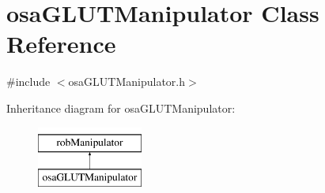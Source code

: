 \hypertarget{classosa_g_l_u_t_manipulator}{}\section{osa\+G\+L\+U\+T\+Manipulator Class Reference}
\label{classosa_g_l_u_t_manipulator}


{\ttfamily \#include $<$osa\+G\+L\+U\+T\+Manipulator.\+h$>$}

Inheritance diagram for osa\+G\+L\+U\+T\+Manipulator\+:\begin{figure}[H]
\begin{center}
\leavevmode
\includegraphics[height=2.000000cm]{dd/dfc/classosa_g_l_u_t_manipulator}
\end{center}
\end{figure}
